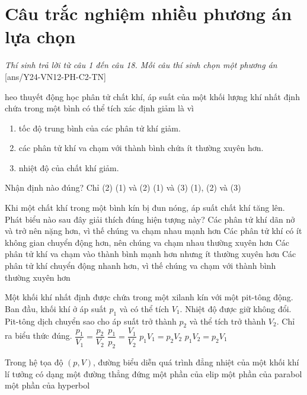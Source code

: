 \section{Câu trắc nghiệm nhiều phương án lựa chọn}
\textit{Thí sinh trả lời từ câu 1 đến câu 18. Mỗi câu thí sinh chọn một phương án}
\setcounter{ex}{0}
[ans/Y24-VN12-PH-C2-TN]
\begin{ex}
	heo thuyết động học phân tử chất khí, áp suất của một khối lượng khí nhất định chứa trong một bình có thể tích xác định giảm là vì
	\begin{enumerate}[label=(\arabic*)]
		\item tốc độ trung bình của các phân tử khí giảm.
		\item các phân tử khí va chạm với thành bình chứa ít thường xuyên hơn.
		\item nhiệt độ của chất khí giảm.
	\end{enumerate}
	Nhận định nào đúng?
	\choice
	{Chỉ (2)}
	{(1) và (2)}
	{(1) và (3)}
	{\True (1), (2) và (3)}
	\loigiai{}
\end{ex}
\begin{ex}
	Khi một chất khí trong một bình kín bị đun nóng, áp suất chất khí tăng lên. Phát biểu nào sau đây giải thích đúng hiện tượng này?
	\choice
	{Các phân tử khí dãn nở và trở nên nặng hơn, vì thế chúng va chạm nhau mạnh hơn}
	{Các phân tử khí có ít không gian chuyển động hơn, nên chúng va chạm nhau thường xuyên hơn}
	{Các phân tử khí va chạm vào thành bình mạnh hơn nhưng ít thường xuyên hơn}
	{\True Các phân tử khí chuyển động nhanh hơn, vì thế chúng va chạm với thành bình thường xuyên hơn}
	\loigiai{}
\end{ex}
\begin{ex}
	Một khối khí nhất định được chứa trong một xilanh kín với một pit-tông động. Ban đầu, khối khí ở áp suất $p_1$ và có thể tích $V_1$. Nhiệt độ được giữ không đổi. Pit-tông dịch chuyển sao cho áp suất trở thành $p_2$ và thể tích trở thành $V_2$. Chỉ ra biểu thức đúng.
	\choice
	{$\dfrac{p_1}{V_1}=\dfrac{p_2}{V_2}$}
	{$\dfrac{p_1}{p_2}=\dfrac{V_1}{V_2}$}
	{\True $p_1 V_1=p_2 V_2$}
	{$p_1 V_2=p_2 V_1$}
	\loigiai{}
\end{ex}
\begin{ex}
	Trong hệ tọa độ $(p, V)$, đường biểu diễn quá trình đẳng nhiệt của một khối khí lí tưởng có dạng
	\choice
	{một đường thẳng đứng}
	{một phần của elip}
	{một phần của parabol}
	{\True một phần của hyperbol}
	\loigiai{}
\end{ex}
